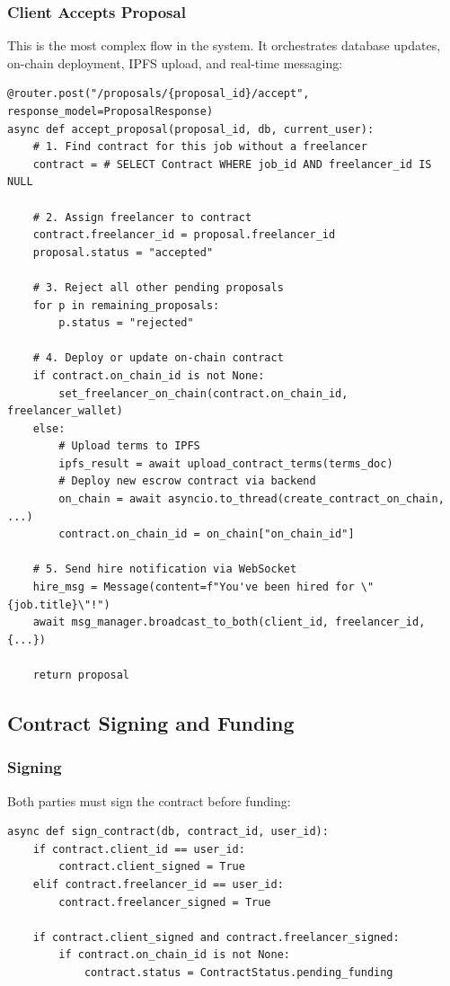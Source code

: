 \documentclass[12pt,a4paper]{article}
\begin{document}
\subsubsection{Client Accepts Proposal}
This is the most complex flow in the system. It orchestrates database updates, on-chain deployment, IPFS upload, and real-time messaging:

\begin{lstlisting}[style=pythonstyle]
@router.post("/proposals/{proposal_id}/accept", response_model=ProposalResponse)
async def accept_proposal(proposal_id, db, current_user):
    # 1. Find contract for this job without a freelancer
    contract = # SELECT Contract WHERE job_id AND freelancer_id IS NULL

    # 2. Assign freelancer to contract
    contract.freelancer_id = proposal.freelancer_id
    proposal.status = "accepted"

    # 3. Reject all other pending proposals
    for p in remaining_proposals:
        p.status = "rejected"

    # 4. Deploy or update on-chain contract
    if contract.on_chain_id is not None:
        set_freelancer_on_chain(contract.on_chain_id, freelancer_wallet)
    else:
        # Upload terms to IPFS
        ipfs_result = await upload_contract_terms(terms_doc)
        # Deploy new escrow contract via backend
        on_chain = await asyncio.to_thread(create_contract_on_chain, ...)
        contract.on_chain_id = on_chain["on_chain_id"]

    # 5. Send hire notification via WebSocket
    hire_msg = Message(content=f"You've been hired for \"{job.title}\"!")
    await msg_manager.broadcast_to_both(client_id, freelancer_id, {...})

    return proposal
\end{lstlisting}

\subsection{Contract Signing and Funding}

\subsubsection{Signing}
Both parties must sign the contract before funding:

\begin{lstlisting}[style=pythonstyle]
async def sign_contract(db, contract_id, user_id):
    if contract.client_id == user_id:
        contract.client_signed = True
    elif contract.freelancer_id == user_id:
        contract.freelancer_signed = True

    if contract.client_signed and contract.freelancer_signed:
        if contract.on_chain_id is not None:
            contract.status = ContractStatus.pending_funding
\end{lstlisting}
\end{document}
